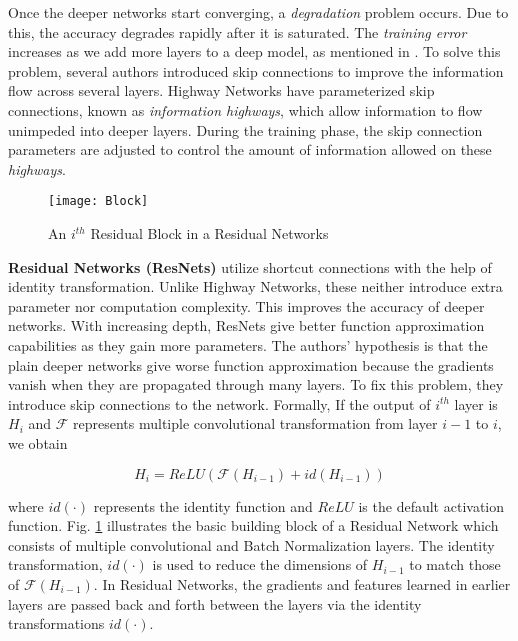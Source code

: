 \documentclass[10pt,twocolumn,letterpaper]{article}
\begin{document}
Once the deeper networks start converging, a \emph{degradation} problem occurs. Due to this, the accuracy degrades rapidly after it is saturated. The \emph{training error} increases as we add more layers to a deep model, as mentioned in \cite{[2]}. To solve this problem, several authors introduced skip connections to improve the information flow across several layers. Highway Networks \cite{[7]} have parameterized skip connections, known as \emph{information highways}, which allow information to flow unimpeded into deeper layers. During the training phase, the skip connection parameters are adjusted to control the amount of information allowed on these \emph{highways}.

\begin{figure}
\centering
\texttt{[image: Block]}
\caption{An \( i^{th} \) Residual Block in a Residual Networks}
\label{fig:resblock}
\end{figure}

\textbf{Residual Networks (ResNets)} \cite{[1]} utilize shortcut connections with the help of identity transformation. Unlike Highway Networks, these neither introduce extra parameter nor computation complexity. This improves the accuracy of deeper networks. With increasing depth, ResNets give better function approximation capabilities as they gain more parameters. The authors' hypothesis is that the plain deeper networks give worse function approximation because the gradients vanish when they are propagated through many layers. To fix this problem, they introduce skip connections to the network. Formally, If the output of \( i^{th} \) layer is \( H_i \) and \( \mathcal{F} \) represents multiple convolutional transformation from layer \( i-1 \) to \( i \), we obtain

\begin{equation} \label{eq:1}
 H_i = ReLU( \mathcal{F}(H_{i-1}) + id(H_{i-1} ))
\end{equation}

where \( id(\cdot) \) represents the identity function and \( ReLU \) \cite{[8]} is the default activation function. Fig. \ref{fig:resblock} illustrates the basic building block of a Residual Network which consists of multiple convolutional and Batch Normalization layers. The identity transformation, \( id(\cdot) \) is used to reduce the dimensions of \( H_{i-1} \) to match those of \( \mathcal{F}(H_{i-1}) \). In Residual Networks, the gradients and features learned in earlier layers are passed back and forth between the layers via the identity transformations \( id(\cdot) \).
\end{document}
